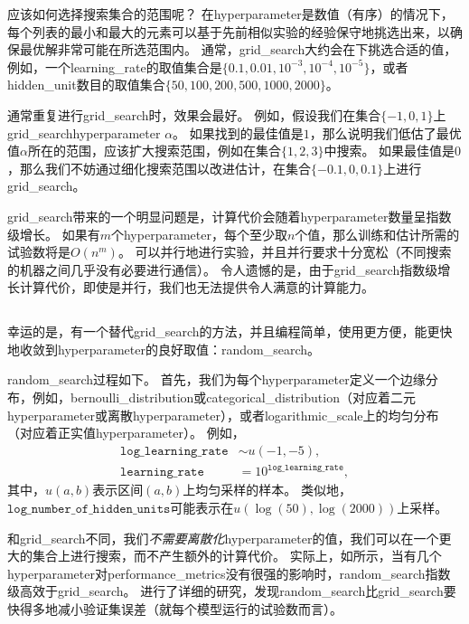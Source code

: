 应该如何选择搜索集合的范围呢？
在\gls{hyperparameter}是数值（有序）的情况下，每个列表的最小和最大的元素可以基于先前相似实验的经验保守地挑选出来，以确保最优解非常可能在所选范围内。
通常，\gls{grid_search}大约会在下挑选合适的值，例如，一个\gls{learning_rate}的取值集合是$\{0.1,0.01,10^{-3},10^{-4},10^{-5}\}$，或者\gls{hidden_unit}数目的取值集合$\{50,100,200,500,1000,2000\}$。

通常重复进行\gls{grid_search}时，效果会最好。
例如，假设我们在集合$\{-1,0,1\}$上\gls{grid_search}\gls{hyperparameter} $\alpha$。
如果找到的最佳值是$1$，那么说明我们低估了最优值$\alpha$所在的范围，应该扩大搜索范围，例如在集合$\{1,2,3\}$中搜索。
如果最佳值是$0$，那么我们不妨通过细化搜索范围以改进估计，在集合$\{-0.1,0,0.1\}$上进行\gls{grid_search}。


\gls{grid_search}带来的一个明显问题是，计算代价会随着\gls{hyperparameter}数量呈指数级增长。
如果有$m$个\gls{hyperparameter}，每个至少取$n$个值，那么训练和估计所需的试验数将是$O(n^m)$。
可以并行地进行实验，并且并行要求十分宽松（不同搜索的机器之间几乎没有必要进行通信）。
令人遗憾的是，由于\gls{grid_search}指数级增长计算代价，即使是并行，我们也无法提供令人满意的计算能力。


\subsection{}
\label{sec:random_search}
幸运的是，有一个替代\gls{grid_search}的方法，并且编程简单，使用更方便，能更快地收敛到\gls{hyperparameter}的良好取值：\gls{random_search}\citep{Bergstra+Bengio-2012-small}。

\gls{random_search}过程如下。
首先，我们为每个\gls{hyperparameter}定义一个边缘分布，例如，\gls{bernoulli_distribution}或\gls{categorical_distribution}（对应着二元\gls{hyperparameter}或离散\gls{hyperparameter}），或者\gls{logarithmic_scale}上的均匀分布（对应着正实值\gls{hyperparameter}）。
例如，
\begin{align}
	\texttt{log\_learning\_rate} &\sim u(-1, -5), \\
	\texttt{learning\_rate} &= 10^{\texttt{log\_learning\_rate}},
\end{align}
其中，$u(a,b)$表示区间$(a,b)$上均匀采样的样本。
类似地，$\texttt{log\_number\_of\_hidden\_units}$可能表示在$u(\log(50), \log(2000))$上采样。

和\gls{grid_search}不同，我们\emph{不需要离散化}\gls{hyperparameter}的值，我们可以在一个更大的集合上进行搜索，而不产生额外的计算代价。
实际上，如所示，当有几个\gls{hyperparameter}对\gls{performance_metrics}没有很强的影响时，\gls{random_search}指数级高效于\gls{grid_search}。
\cite{Bergstra+Bengio-2012-small}进行了详细的研究，发现\gls{random_search}比\gls{grid_search}要快得多地减小验证集误差（就每个模型运行的试验数而言）。

